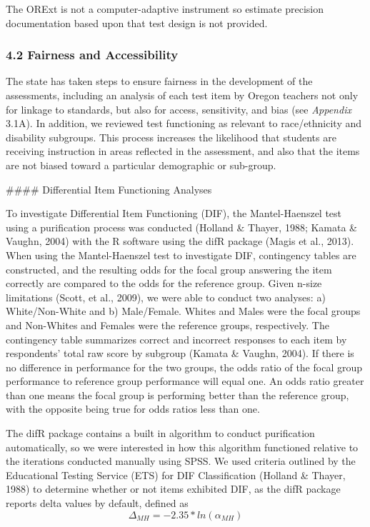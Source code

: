 \documentclass[]{article}
\begin{document}
The ORExt is not a computer-adaptive instrument so estimate precision
documentation based upon that test design is not provided.

\subsubsection{4.2 Fairness and
Accessibility}\label{fairness-and-accessibility}

The state has taken steps to ensure fairness in the development of the
assessments, including an analysis of each test item by Oregon teachers
not only for linkage to standards, but also for access, sensitivity, and
bias (see \emph{Appendix} 3.1A). In addition, we reviewed test
functioning as relevant to race/ethnicity and disability subgroups. This
process increases the likelihood that students are receiving instruction
in areas reflected in the assessment, and also that the items are not
biased toward a particular demographic or sub-group.

\clearpage
\#\#\#\# Differential Item Functioning Analyses

To investigate Differential Item Functioning (DIF), the Mantel-Haenszel
test using a purification process was conducted (Holland \& Thayer,
1988; Kamata \& Vaughn, 2004) with the R software using the difR package
(Magis et al., 2013). When using the Mantel-Haenszel test to investigate
DIF, contingency tables are constructed, and the resulting odds for the
focal group answering the item correctly are compared to the odds for
the reference group. Given n-size limitations (Scott, et al., 2009), we
were able to conduct two analyses: a) White/Non-White and b)
Male/Female. Whites and Males were the focal groups and Non-Whites and
Females were the reference groups, respectively. The contingency table
summarizes correct and incorrect responses to each item by respondents'
total raw score by subgroup (Kamata \& Vaughn, 2004). If there is no
difference in performance for the two groups, the odds ratio of the
focal group performance to reference group performance will equal one.
An odds ratio greater than one means the focal group is performing
better than the reference group, with the opposite being true for odds
ratios less than one.

The difR package contains a built in algorithm to conduct purification
automatically, so we were interested in how this algorithm functioned
relative to the iterations conducted manually using SPSS. We used
criteria outlined by the Educational Testing Service (ETS) for DIF
Classification (Holland \& Thayer, 1988) to determine whether or not
items exhibited DIF, as the difR package reports delta values by
default, defined as \[\Delta_{MH} =
-2.35*ln(\alpha_{MH})\]
\end{document}

